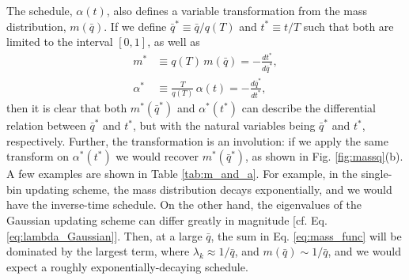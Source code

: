 \documentclass[reprint, superscriptaddress, floatfix]{revtex4-1}
\begin{document}
The schedule, $\alpha(t)$,
also defines a variable transformation from
the mass distribution, $m(\bar q)$.
%
If we define
$\bar q^* \equiv \bar q/q(T)$
and $t^* \equiv t/T$
such that both are limited to the interval $[0, 1]$,
as well as
\begin{align*}
  m^*       &\equiv q(T) \, m(\bar q) = -\frac{ dt^* } { d\bar q^* },
  \\
  \alpha^*  &\equiv \frac{T}{q(T)} \, \alpha(t) = -\frac{ d\bar q^* } { dt^* },
\end{align*}
then it is clear that
both $m^*(\bar q^*)$ and $\alpha^*(t^*)$
can describe the differential relation
between $\bar q^*$ and $t^*$,
but with the natural variables
being $\bar q^*$ and $t^*$, respectively.
%
Further, the transformation is an involution:
if we apply the same transform on $\alpha^*(t^*)$
we would recover $m^*(\bar q^*)$,
as shown in Fig. \ref{fig:massq}(b).
%
A few examples are shown in Table \ref{tab:m_and_a}.
%
For example, in the single-bin updating scheme,
the mass distribution decays exponentially,
and we would have the inverse-time schedule.
%
On the other hand,
the eigenvalues of the Gaussian updating scheme
can differ greatly in magnitude
[cf. Eq. \eqref{eq:lambda_Gaussian}].
%
Then, at a large $\bar q$,
the sum in Eq. \eqref{eq:mass_func} will be dominated by
the largest term, where $\lambda_k \approx 1/\bar q$,
and $m(\bar q) \sim 1/\bar q$,
and we would expect a roughly exponentially-decaying schedule.
\end{document}
